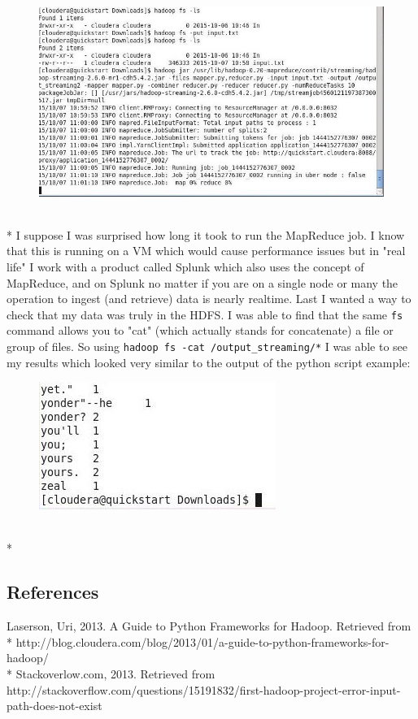 \documentclass[10pt]{article}
\begin{document}
\begin{figure}[!h]
\includegraphics[scale=0.45]{cloudera_start1.jpg}
\centering
\end{figure}\\*
I suppose I was surprised how long it took to run the MapReduce job. I know that this is running on a VM which would cause performance issues but in "real life" I work with a product called Splunk which also uses the concept of MapReduce, and on Splunk no matter if you are on a single node or many the operation to ingest (and retrieve) data is nearly realtime. Last I wanted a way to check that my data was truly in the HDFS. I was able to find that the same \verb|fs| command allows you to "cat" (which actually stands for concatenate) a file or group of files. So using \verb|hadoop fs -cat /output_streaming/*| I was able to see my results which looked very similar to the output of the python script example:
\begin{figure}[!h]
\includegraphics[scale=0.8]{cloudera_catoutput1.png}
\centering
\end{figure}\\*
\pagebreak
\subsection*{References}
Laserson, Uri, 2013. A Guide to Python Frameworks for Hadoop. Retrieved from\\*
http://blog.cloudera.com/blog/2013/01/a-guide-to-python-frameworks-for-hadoop/\\*
Stackoverlow.com, 2013. Retrieved from http://stackoverflow.com/questions/15191832/first-hadoop-project-error-input-path-does-not-exist
\end{document}
